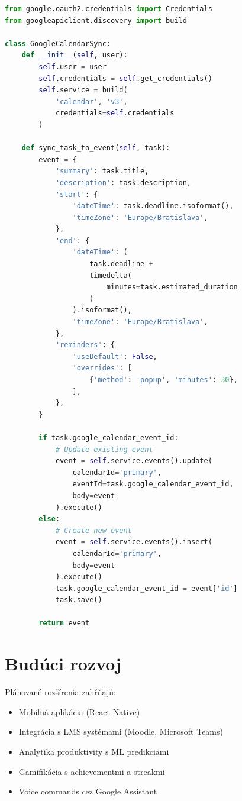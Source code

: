\documentclass[10pt,twocolumn,twoside,slovak,a4paper]{article}
\begin{document}
\begin{lstlisting}[language=Python, caption=Google Calendar synchronizacia]
from google.oauth2.credentials import Credentials
from googleapiclient.discovery import build

class GoogleCalendarSync:
    def __init__(self, user):
        self.user = user
        self.credentials = self.get_credentials()
        self.service = build(
            'calendar', 'v3',
            credentials=self.credentials
        )
    
    def sync_task_to_event(self, task):
        event = {
            'summary': task.title,
            'description': task.description,
            'start': {
                'dateTime': task.deadline.isoformat(),
                'timeZone': 'Europe/Bratislava',
            },
            'end': {
                'dateTime': (
                    task.deadline + 
                    timedelta(
                        minutes=task.estimated_duration
                    )
                ).isoformat(),
                'timeZone': 'Europe/Bratislava',
            },
            'reminders': {
                'useDefault': False,
                'overrides': [
                    {'method': 'popup', 'minutes': 30},
                ],
            },
        }
        
        if task.google_calendar_event_id:
            # Update existing event
            event = self.service.events().update(
                calendarId='primary',
                eventId=task.google_calendar_event_id,
                body=event
            ).execute()
        else:
            # Create new event
            event = self.service.events().insert(
                calendarId='primary',
                body=event
            ).execute()
            task.google_calendar_event_id = event['id']
            task.save()
        
        return event
\end{lstlisting}

\section{Budúci rozvoj}

Plánované rozšírenia zahŕňajú:

\begin{itemize}
\item Mobilná aplikácia (React Native)
\item Integrácia s LMS systémami (Moodle, Microsoft Teams)
\item Analytika produktivity s ML predikciami
\item Gamifikácia s achievementmi a streakmi
\item Voice commands cez Google Assistant
\end{itemize}
\end{document}

